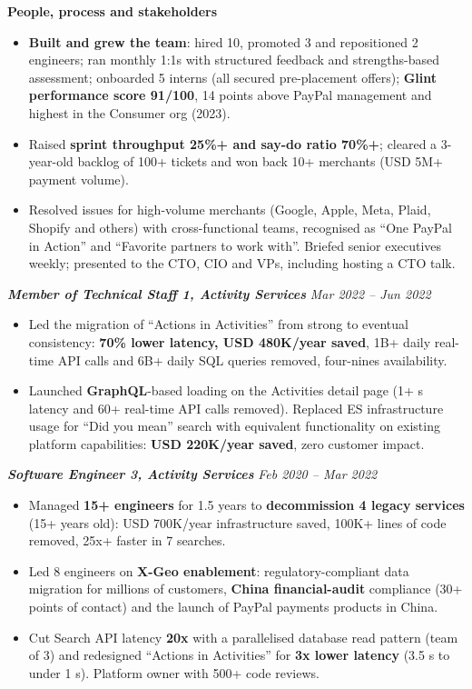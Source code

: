 \documentclass[10pt,a4paper]{article}
\newcommand{\bd}[1]{\textbf{#1}}
\newcommand{\role}[2]{%
  \par\vspace{5pt}\noindent\textcolor{rolecolor}{\textbf{\textit{#1}}}\hfill
  \textcolor{rolecolor}{\textit{#2}}\par\nopagebreak}
\newcommand{\subhead}[1]{%
  \par\vspace{4pt}\noindent\textcolor{rolecolor}{\textbf{#1}}\par\nopagebreak\vspace{0.5pt}}
\begin{document}
\subhead{People, process and stakeholders}
\begin{itemize}
\item \bd{Built and grew the team}: hired 10, promoted 3 and repositioned 2 engineers; ran
  monthly 1:1s with structured feedback and strengths-based assessment; onboarded 5 interns
  (all secured pre-placement offers); \bd{Glint performance score 91/100}, 14 points above
  PayPal management and highest in the Consumer org (2023).
\item Raised \bd{sprint throughput 25\%+ and say-do ratio 70\%+}; cleared a 3-year-old backlog of
  100+ tickets and won back 10+ merchants (USD 5M+ payment volume).
\item Resolved issues for high-volume merchants (Google, Apple, Meta, Plaid, Shopify and others)
  with cross-functional teams, recognised as ``One PayPal in Action'' and ``Favorite partners to work with''. 
  Briefed senior executives weekly; presented to the CTO, CIO and VPs, including hosting a CTO talk.
\end{itemize}

\role{Member of Technical Staff 1, Activity Services}{Mar 2022 -- Jun 2022}
\begin{itemize}
\item Led the migration of ``Actions in Activities'' from strong to eventual consistency:
  \bd{70\% lower latency, USD 480K/year saved}, 1B+ daily real-time API calls and 6B+ daily SQL
  queries removed, four-nines availability.
\item Launched \bd{GraphQL}-based loading on the Activities detail page (1+ s latency and 60+
  real-time API calls removed). Replaced ES infrastructure usage for ``Did you mean'' search with
  equivalent functionality on existing platform capabilities: \bd{USD 220K/year saved}, zero
  customer impact.
\end{itemize}

\role{Software Engineer 3, Activity Services}{Feb 2020 -- Mar 2022}
\begin{itemize}
\item Managed \bd{15+ engineers} for 1.5 years to \bd{decommission 4 legacy services} (15+ years
  old): USD 700K/year infrastructure saved, 100K+ lines of code removed,
  25x+ faster in 7 searches.
\item Led 8 engineers on \bd{X-Geo enablement}: regulatory-compliant data
  migration for millions of customers, \bd{China financial-audit} compliance (30+ points of
  contact) and the launch of PayPal payments products in China.
\item Cut Search API latency \bd{20x} with a parallelised database read pattern (team of 3) and
  redesigned ``Actions in Activities'' for \bd{3x lower latency} (3.5 s to under 1 s). Platform
  owner with 500+ code reviews.
\end{itemize}
\end{document}
